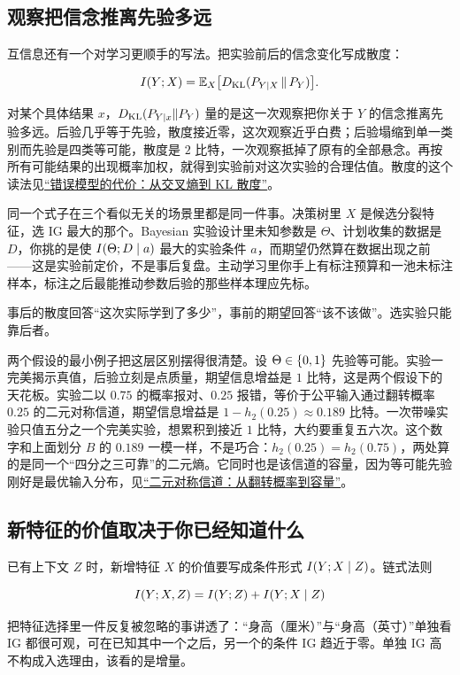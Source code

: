 \subsection{观察把信念推离先验多远}

互信息还有一个对学习更顺手的写法。把实验前后的信念变化写成散度：

\[
I(Y;X)=\mathbb{E}_X\bigl[D_{\mathrm{KL}}(P_{Y\mid X}\,\|\,P_Y)\bigr].
\]

对某个具体结果 \(x\)，\(D_{\mathrm{KL}}(P_{Y\mid x}\|P_Y)\) 量的是这一次观察把你关于 \(Y\) 的信念推离先验多远。后验几乎等于先验，散度接近零，这次观察近乎白费；后验塌缩到单一类别而先验是四类等可能，散度是 \(2\) 比特，一次观察抵掉了原有的全部悬念。再按所有可能结果的出现概率加权，就得到实验前对这次实验的合理估值。散度的这个读法见\hyperref[sec:07-Information-Theory/03-Divergences/01]{``错误模型的代价：从交叉熵到 KL 散度''}。

同一个式子在三个看似无关的场景里都是同一件事。决策树里 \(X\) 是候选分裂特征，选 IG 最大的那个。Bayesian 实验设计里未知参数是 \(\Theta\)、计划收集的数据是 \(D\)，你挑的是使 \(I(\Theta;D\mid a)\) 最大的实验条件 \(a\)，而期望仍然算在数据出现之前——这是实验前定价，不是事后复盘。主动学习里你手上有标注预算和一池未标注样本，标注之后最能推动参数后验的那些样本理应先标。

事后的散度回答``这次实际学到了多少''，事前的期望回答``该不该做''。选实验只能靠后者。

两个假设的最小例子把这层区别摆得很清楚。设 \(\Theta\in\left\{0,1\right\}\) 先验等可能。实验一完美揭示真值，后验立刻是点质量，期望信息增益是 \(1\) 比特，这是两个假设下的天花板。实验二以 \(0.75\) 的概率报对、\(0.25\) 报错，等价于公平输入通过翻转概率 \(0.25\) 的二元对称信道，期望信息增益是 \(1-h_2(0.25)\approx0.189\) 比特。一次带噪实验只值五分之一个完美实验，想累积到接近 \(1\) 比特，大约要重复五六次。这个数字和上面划分 \(B\) 的 \(0.189\) 一模一样，不是巧合：\(h_2(0.25)=h_2(0.75)\)，两处算的是同一个``四分之三可靠''的二元熵。它同时也是该信道的容量，因为等可能先验刚好是最优输入分布，见\hyperref[sec:07-Information-Theory/05-Channel-Coding/02]{``二元对称信道：从翻转概率到容量''}。

\subsection{新特征的价值取决于你已经知道什么}

已有上下文 \(Z\) 时，新增特征 \(X\) 的价值要写成条件形式 \(I(Y;X\mid Z)\)。链式法则

\[
I(Y;X,Z)=I(Y;Z)+I(Y;X\mid Z)
\]

把特征选择里一件反复被忽略的事讲透了：``身高（厘米）''与``身高（英寸）''单独看 IG 都很可观，可在已知其中一个之后，另一个的条件 IG 趋近于零。单独 IG 高不构成入选理由，该看的是增量。

